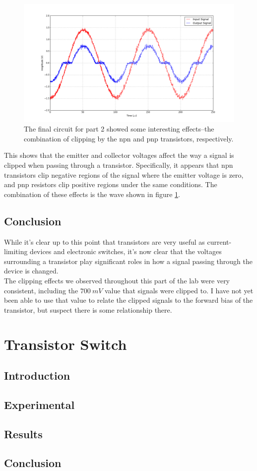 \documentclass[11pt]{article}
\begin{document}
\begin{figure}[H]
    \centering
    \includegraphics[scale=0.4]{Plots/fig2b.png}
    \caption{The final circuit for part 2 showed some interesting effects--the combination of clipping by the npn and pnp transistors, respectively.}
    \label{fig:2b}
\end{figure}

This shows that the emitter and collector voltages affect the way a signal is clipped when passing through a transistor. Specifically, it appears that npn transistors clip negative regions of the signal where the emitter voltage is zero, and pnp resistors clip positive regions under the same conditions. The combination of these effects is the wave shown in figure \ref{fig:2b}.\\

\subsection{Conclusion}

While it's clear up to this point that transistors are very useful as current-limiting devices and electronic switches, it's now clear that the voltages surrounding a transistor play significant roles in how a signal passing through the device is changed.\\

The clipping effects we observed throughout this part of the lab were very consistent, including the $700\ mV$ value that signals were clipped to. I have not yet been able to use that value to relate the clipped signals to the forward bias of the transistor, but suspect there is some relationship there.\\


\section{Transistor Switch}
\subsection{Introduction}

\subsection{Experimental}

\subsection{Results}

\subsection{Conclusion}
\end{document}
